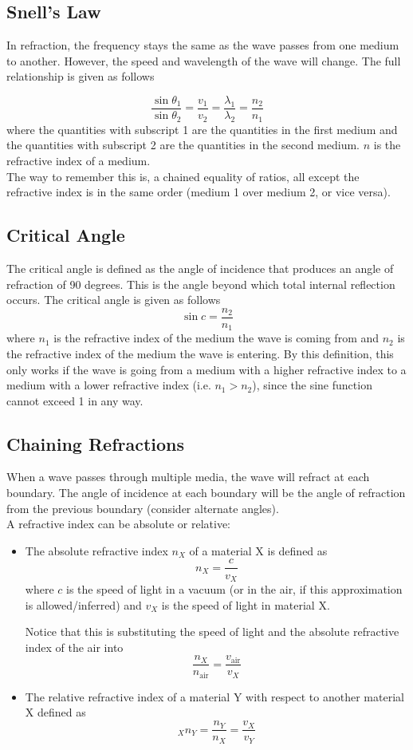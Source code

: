 \documentclass[a4paper,12pt]{article}
\newcommand{\lb}{\\[8pt]}
\begin{document}
\pagebreak

\subsection{Snell's Law}

In refraction, the frequency stays the same as the wave passes from one medium to another. However, the speed and wavelength of the wave will change. The full relationship is given as follows

$$\frac{\sin \theta_1}{\sin \theta_2} = \frac{v_1}{v_2} = \frac{\lambda_1}{\lambda_2} = \frac{n_2}{n_1}$$
where the quantities with subscript 1 are the quantities in the first medium and the quantities with subscript 2 are the quantities in the second medium. $n$ is the refractive index of a medium.\lb
The way to remember this is, a chained equality of ratios, all except the refractive index is in the same order (medium 1 over medium 2, or vice versa).


\subsection{Critical Angle}

The critical angle is defined as the angle of incidence that produces an angle of refraction of 90 degrees. This is the angle beyond which total internal reflection occurs. The critical angle is given as follows
$$\sin c = \frac{n_2}{n_1}$$
where $n_1$ is the refractive index of the medium the wave is coming from and $n_2$ is the refractive index of the medium the wave is entering. By this definition, this only works if the wave is going from a medium with a higher refractive index to a medium with a lower refractive index (i.e. $n_1 > n_2$), since the sine function cannot exceed 1 in any way.


\subsection{Chaining Refractions}

When a wave passes through multiple media, the wave will refract at each boundary. The angle of incidence at each boundary will be the angle of refraction from the previous boundary (consider alternate angles).\lb
A refractive index can be absolute or relative:
\begin{itemize}
  \item The absolute refractive index $n_X$ of a material X is defined as
        $$n_X = \frac{c}{v_X}$$
        where $c$ is the speed of light in a vacuum (or in the air, if this approximation is allowed/inferred) and $v_X$ is the speed of light in material X.

        Notice that this is substituting the speed of light and the absolute refractive index of the air into $$\frac{n_X}{n_{\text{air}}} = \frac{v_{\text{air}}}{v_X}$$
  \item The relative refractive index of a material Y with respect to another material X defined as
        $$_Xn_Y = \frac{n_Y}{n_X}=\frac{v_X}{v_Y}$$
\end{itemize}
\end{document}
